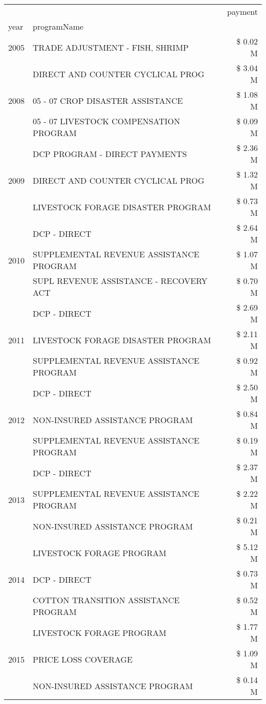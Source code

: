 \begin{tabular}{llr}
\toprule
 &  & payment \\
year & programName &  \\
\midrule
2005 & TRADE ADJUSTMENT - FISH, SHRIMP & \$ 0.02 M \\
\cline{1-3}
\multirow[t]{3}{*}{2008} & DIRECT AND COUNTER CYCLICAL PROG & \$ 3.04 M \\
 & 05 - 07 CROP DISASTER ASSISTANCE & \$ 1.08 M \\
 & 05 - 07 LIVESTOCK COMPENSATION PROGRAM & \$ 0.09 M \\
\cline{1-3}
\multirow[t]{3}{*}{2009} & DCP PROGRAM - DIRECT PAYMENTS & \$ 2.36 M \\
 & DIRECT AND COUNTER CYCLICAL PROG & \$ 1.32 M \\
 & LIVESTOCK FORAGE DISASTER  PROGRAM & \$ 0.73 M \\
\cline{1-3}
\multirow[t]{3}{*}{2010} & DCP - DIRECT & \$ 2.64 M \\
 & SUPPLEMENTAL REVENUE ASSISTANCE PROGRAM & \$ 1.07 M \\
 & SUPL REVENUE ASSISTANCE - RECOVERY ACT & \$ 0.70 M \\
\cline{1-3}
\multirow[t]{3}{*}{2011} & DCP - DIRECT & \$ 2.69 M \\
 & LIVESTOCK FORAGE DISASTER PROGRAM & \$ 2.11 M \\
 & SUPPLEMENTAL REVENUE ASSISTANCE PROGRAM & \$ 0.92 M \\
\cline{1-3}
\multirow[t]{3}{*}{2012} & DCP - DIRECT & \$ 2.50 M \\
 & NON-INSURED ASSISTANCE PROGRAM & \$ 0.84 M \\
 & SUPPLEMENTAL REVENUE ASSISTANCE PROGRAM & \$ 0.19 M \\
\cline{1-3}
\multirow[t]{3}{*}{2013} & DCP - DIRECT & \$ 2.37 M \\
 & SUPPLEMENTAL REVENUE ASSISTANCE PROGRAM & \$ 2.22 M \\
 & NON-INSURED ASSISTANCE PROGRAM & \$ 0.21 M \\
\cline{1-3}
\multirow[t]{3}{*}{2014} & LIVESTOCK FORAGE PROGRAM & \$ 5.12 M \\
 & DCP - DIRECT & \$ 0.73 M \\
 & COTTON TRANSITION ASSISTANCE PROGRAM & \$ 0.52 M \\
\cline{1-3}
\multirow[t]{3}{*}{2015} & LIVESTOCK FORAGE PROGRAM & \$ 1.77 M \\
 & PRICE LOSS COVERAGE & \$ 1.09 M \\
 & NON-INSURED ASSISTANCE PROGRAM & \$ 0.14 M \\

\end{tabular}
